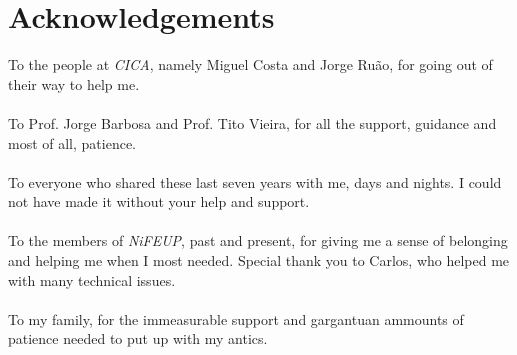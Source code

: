 \chapter*{Acknowledgements}

To the people at \emph{CICA}, namely Miguel Costa and Jorge Ruão, for going out of their way to help me.\\
\ \\
To Prof. Jorge Barbosa and Prof. Tito Vieira, for all the support, guidance and most of all, patience.\\
\ \\
To everyone who shared these last seven years with me, days and nights. I could not have made it without your help and support.\\
\ \\
To the members of \emph{NiFEUP}, past and present, for giving me a sense of belonging and helping me when I most needed. Special thank you to Carlos, who helped me with many technical issues.\\
\ \\
To my family, for the immeasurable support and gargantuan ammounts of patience needed to put up with my antics.

\vspace{10mm}

